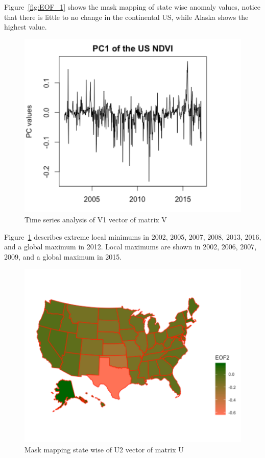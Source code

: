     Figure~\ref{fig:EOF_1} shows the mask mapping of state wise anomaly values, notice that there is little to no change in the continental US, while Alaska shows the highest value.
    
     \begin{figure}[H]
            \centering
            \includegraphics[width=0.70\linewidth]{figures/ch5/SVD/pc1.png}
            \caption{\label{fig:V_1} Time series analysis of V1 vector of matrix V}
    \end{figure}
    
    Figure~\ref{fig:V_1} describes extreme local minimums in 2002, 2005, 2007, 2008, 2013, 2016, and a global maximum in 2012. Local maximums are shown in 2002, 2006, 2007, 2009, and a global maximum in 2015. 
    
    \begin{figure}[H]
            \centering
            \includegraphics[width=0.70\linewidth]{figures/ch5/SVD/eof2.png}
            \caption{\label{fig:EOF_2} Mask mapping state wise of U2 vector of matrix U}
    \end{figure}
    
